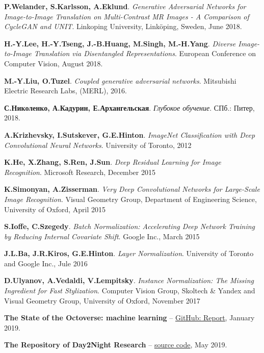 \documentclass[11pt,a4paper]{extarticle}
\begin{document}
{\begin{thebibliography}{00}
	\textbf{P.Welander, S.Karlsson, A.Eklund}.
	\emph{Generative Adversarial Networks for Image-to-Image Translation on Multi-Contrast MR Images - A Comparison of CycleGAN and UNIT}.
	Linkoping University, Linköping, Sweden,
	June 2018.

	\textbf{H.-Y.Lee, H.-Y.Tseng, J.-B.Huang, M.Singh, M.-H.Yang}.
	\emph{Diverse Image-to-Image Translation via Disentangled Representations}.
	European Conference on Computer Vision,
	August 2018.

	\textbf{M.-Y.Liu, O.Tuzel}.
	\emph{Coupled generative adversarial networks}.
	Mitsubishi Electric Research Labs, (MERL),
	2016.

	\textbf{С.Николенко, А.Кадурин, Е.Архангельская}.
	\emph{Глубокое обучение}.
	СПб.: Питер, 
	2018.

	\textbf{A.Krizhevsky, I.Sutskever, G.E.Hinton}.
	\emph{ImageNet Classification with Deep Convolutional Neural Networks}.
	University of Toronto,
	2012

	\textbf{K.He, X.Zhang, S.Ren, J.Sun}.
	\emph{Deep Residual Learning for Image Recognition}.
	Microsoft Research,
	December 2015

	\textbf{K.Simonyan, A.Zisserman}.
	\emph{Very Deep Convolutional Networks for Large-Scale Image Recognition}.
	Visual Geometry Group, Department of Engineering Science, University of Oxford,
	April 2015

	\textbf{S.Ioffe, C.Szegedy}.
	\emph{Batch Normalization: Accelerating Deep Network Training by Reducing Internal Covariate Shift}.
	Google Inc.,
	March 2015

	\textbf{J.L.Ba, J.R.Kiros, G.E.Hinton}.
	\emph{Layer Normalization}.
	University of Toronto and Google Inc.,
	Jule 2016

	\textbf{D.Ulyanov, A.Vedaldi, V.Lempitsky}.
	\emph{Instance Normalization: The Missing Ingredient for Fast Stylization}.
	Computer Vision Group, Skoltech \& Yandex and Visual Geometry Group, University of Oxford,
	November 2017

	\textbf{The State of the Octoverse: machine learning} --
	\href{https://github.blog/2019-01-24-the-state-of-the-octoverse-machine-learning/}{\underline{GitHub: Report}},
	January 2019.

	\textbf{The Repository of Day2Night Research} --
	\href{https://github.com/solesensei/day2night}{\underline{source code}},
	May 2019.


\end{thebibliography}}
\end{document}
